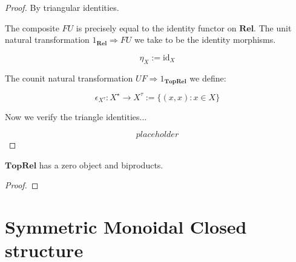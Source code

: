 \begin{proposition}
\begin{proof}

By triangular identities.

The composite $FU$ is precisely equal to the identity functor on $\mathbf{Rel}$. The unit natural transformation $1_\mathbf{Rel} \Rightarrow FU$ we take to be the identity morphisms.

\[\eta_{X} := \text{id}_{X}\]

The counit natural transformation $UF \Rightarrow 1_{\mathbf{TopRel}}$ we define:

\[\epsilon_{X^\tau} : X^\star \rightarrow X^\tau := \{(x,x) : x \in X\}\]

Now we verify the triangle identities...

\[placeholder\]

\end{proof}
\end{proposition}

\begin{corollary}
$\mathbf{TopRel}$ has a zero object and biproducts.
\begin{proof}

\end{proof}
\end{corollary}

\section{Symmetric Monoidal Closed structure}


